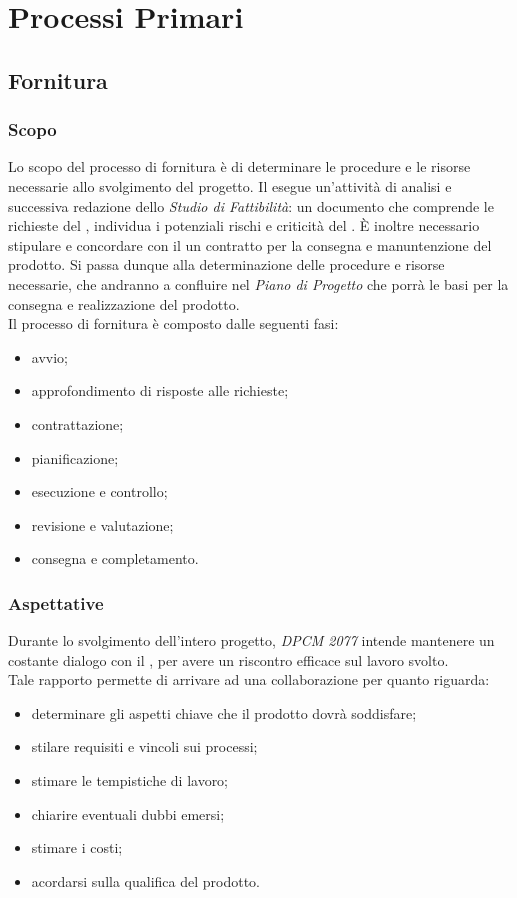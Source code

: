 \section{Processi Primari}
	\subsection{Fornitura}
		\subsubsection{Scopo}
		Lo scopo del processo di fornitura è di determinare le procedure e le risorse necessarie allo
		svolgimento del progetto. Il  esegue un'attività di analisi e successiva redazione dello \textit{Studio di Fattibilità}: un documento che comprende le richieste del , individua i potenziali rischi e criticità del .
		È inoltre necessario stipulare e concordare con il  un contratto per la consegna e manuntenzione del prodotto. 
		Si passa dunque alla determinazione delle procedure e risorse necessarie, che andranno a confluire nel \textit{Piano di Progetto} che porrà le basi per la consegna e realizzazione del prodotto.
		\\
		Il processo di fornitura è composto dalle seguenti fasi:
		\begin{itemize}
			\item avvio;
			\item approfondimento di risposte alle richieste;
			\item contrattazione;
			\item pianificazione;
			\item esecuzione e controllo;
			\item revisione e valutazione;
			\item consegna e completamento.
		\end{itemize}
		\subsubsection{Aspettative}
		Durante lo svolgimento dell'intero progetto, \textit{DPCM 2077} intende mantenere un costante dialogo con il , per avere un riscontro efficace sul lavoro svolto.
		\\
		Tale rapporto permette di arrivare ad una collaborazione per quanto riguarda:
		\begin{itemize}
			\item determinare gli aspetti chiave che il prodotto dovrà soddisfare;
			\item stilare requisiti e vincoli sui processi;
			\item stimare le tempistiche di lavoro;
			\item chiarire eventuali dubbi emersi;
			\item stimare i costi;
			\item acordarsi sulla qualifica del prodotto.
		\end{itemize}
